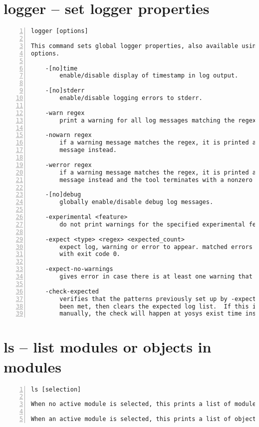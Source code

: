 \section{logger -- set logger properties}
\label{cmd:logger}
\begin{lstlisting}[numbers=left,frame=single]
    logger [options]

This command sets global logger properties, also available using command line
options.

    -[no]time
        enable/disable display of timestamp in log output.

    -[no]stderr
        enable/disable logging errors to stderr.

    -warn regex
        print a warning for all log messages matching the regex.

    -nowarn regex
        if a warning message matches the regex, it is printed as regular
        message instead.

    -werror regex
        if a warning message matches the regex, it is printed as error
        message instead and the tool terminates with a nonzero return code.

    -[no]debug
        globally enable/disable debug log messages.

    -experimental <feature>
        do not print warnings for the specified experimental feature

    -expect <type> <regex> <expected_count>
        expect log, warning or error to appear. matched errors will terminate
        with exit code 0.

    -expect-no-warnings
        gives error in case there is at least one warning that is not expected.

    -check-expected
        verifies that the patterns previously set up by -expect have actually
        been met, then clears the expected log list.  If this is not called
        manually, the check will happen at yosys exist time instead.
\end{lstlisting}

\section{ls -- list modules or objects in modules}
\label{cmd:ls}
\begin{lstlisting}[numbers=left,frame=single]
    ls [selection]

When no active module is selected, this prints a list of modules.

When an active module is selected, this prints a list of objects in the module.
\end{lstlisting}

